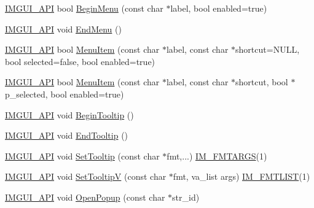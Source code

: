 \begin{DoxyCompactItemize}
\item 
\mbox{\hyperlink{imgui_8h_a43829975e84e45d1149597467a14bbf5}{I\+M\+G\+U\+I\+\_\+\+A\+PI}} bool \mbox{\hyperlink{namespace_im_gui_a1e55711a21f97d5dff919d697d3a7201}{Begin\+Menu}} (const char $\ast$label, bool enabled=true)
\item 
\mbox{\hyperlink{imgui_8h_a43829975e84e45d1149597467a14bbf5}{I\+M\+G\+U\+I\+\_\+\+A\+PI}} void \mbox{\hyperlink{namespace_im_gui_a1448a5a4e8c431c15f991e9255c0df95}{End\+Menu}} ()
\item 
\mbox{\hyperlink{imgui_8h_a43829975e84e45d1149597467a14bbf5}{I\+M\+G\+U\+I\+\_\+\+A\+PI}} bool \mbox{\hyperlink{namespace_im_gui_aa1bae511ca47478998693a9d8c84f2e6}{Menu\+Item}} (const char $\ast$label, const char $\ast$shortcut=N\+U\+LL, bool selected=false, bool enabled=true)
\item 
\mbox{\hyperlink{imgui_8h_a43829975e84e45d1149597467a14bbf5}{I\+M\+G\+U\+I\+\_\+\+A\+PI}} bool \mbox{\hyperlink{namespace_im_gui_a237e76bff3088f1c2622f4aebae2356e}{Menu\+Item}} (const char $\ast$label, const char $\ast$shortcut, bool $\ast$p\+\_\+selected, bool enabled=true)
\item 
\mbox{\hyperlink{imgui_8h_a43829975e84e45d1149597467a14bbf5}{I\+M\+G\+U\+I\+\_\+\+A\+PI}} void \mbox{\hyperlink{namespace_im_gui_a36816a48385f4759d746a03cf6202512}{Begin\+Tooltip}} ()
\item 
\mbox{\hyperlink{imgui_8h_a43829975e84e45d1149597467a14bbf5}{I\+M\+G\+U\+I\+\_\+\+A\+PI}} void \mbox{\hyperlink{namespace_im_gui_ac8d75c160cfdf43d512f773ca133a1c6}{End\+Tooltip}} ()
\item 
\mbox{\hyperlink{imgui_8h_a43829975e84e45d1149597467a14bbf5}{I\+M\+G\+U\+I\+\_\+\+A\+PI}} void \mbox{\hyperlink{namespace_im_gui_a313073fa01b8a9791f241ef93091ce92}{Set\+Tooltip}} (const char $\ast$fmt,...) \mbox{\hyperlink{imgui_8h_a1251c2f9ddac0873dbad8181bd82c9f1}{I\+M\+\_\+\+F\+M\+T\+A\+R\+GS}}(1)
\item 
\mbox{\hyperlink{imgui_8h_a43829975e84e45d1149597467a14bbf5}{I\+M\+G\+U\+I\+\_\+\+A\+PI}} void \mbox{\hyperlink{namespace_im_gui_a3826acf68fc4a12bb66401575f51d6a2}{Set\+TooltipV}} (const char $\ast$fmt, va\+\_\+list args) \mbox{\hyperlink{imgui_8h_a047693beb7f899f5deab1e20202016b3}{I\+M\+\_\+\+F\+M\+T\+L\+I\+ST}}(1)
\item 
\mbox{\hyperlink{imgui_8h_a43829975e84e45d1149597467a14bbf5}{I\+M\+G\+U\+I\+\_\+\+A\+PI}} void \mbox{\hyperlink{namespace_im_gui_a9576648c40b92f54b671e2e51654dd2c}{Open\+Popup}} (const char $\ast$str\+\_\+id)
\item 

\end{DoxyCompactItemize}
